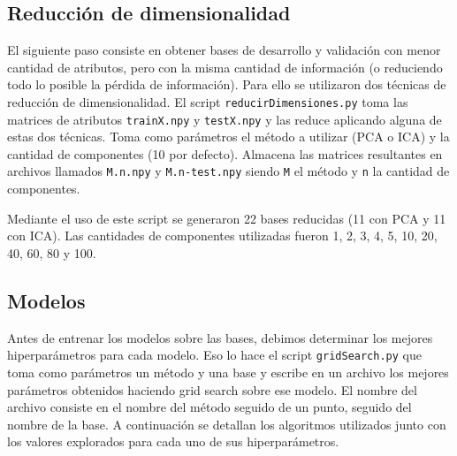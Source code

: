 \documentclass[10pt, a4paper]{article}
\begin{document}
\subsection{Reducción de dimensionalidad}

El siguiente paso consiste en obtener bases de desarrollo y validación con menor cantidad de atributos, pero con la misma cantidad de información (o reduciendo todo lo posible la pérdida de información). Para ello se utilizaron dos técnicas de reducción de dimensionalidad. El script \texttt{reducirDimensiones.py} toma las matrices de atributos \texttt{trainX.npy} y \texttt{testX.npy} y las reduce aplicando alguna de estas dos técnicas. Toma como parámetros el método a utilizar (PCA o ICA) y la cantidad de componentes (10 por defecto). Almacena las matrices resultantes en archivos llamados \texttt{M.n.npy} y \texttt{M.n-test.npy} siendo \texttt{M} el método y \texttt{n} la cantidad de componentes.

Mediante el uso de este script se generaron 22 bases reducidas (11 con PCA y 11 con ICA). Las cantidades de componentes utilizadas fueron 1, 2, 3, 4, 5, 10, 20, 40, 60, 80 y 100.

\subsection{Modelos} \label{modelos}

Antes de entrenar los modelos sobre las bases, debimos determinar los mejores hiperparámetros para cada modelo. Eso lo hace el script \texttt{gridSearch.py} que toma como parámetros un método y una base y escribe en un archivo los mejores parámetros obtenidos haciendo grid search sobre ese modelo. El nombre del archivo consiste en el nombre del método seguido de un punto, seguido del nombre de la base.
A continuación se detallan los algoritmos utilizados junto con los valores explorados para cada uno de sus hiperparámetros.
\end{document}
